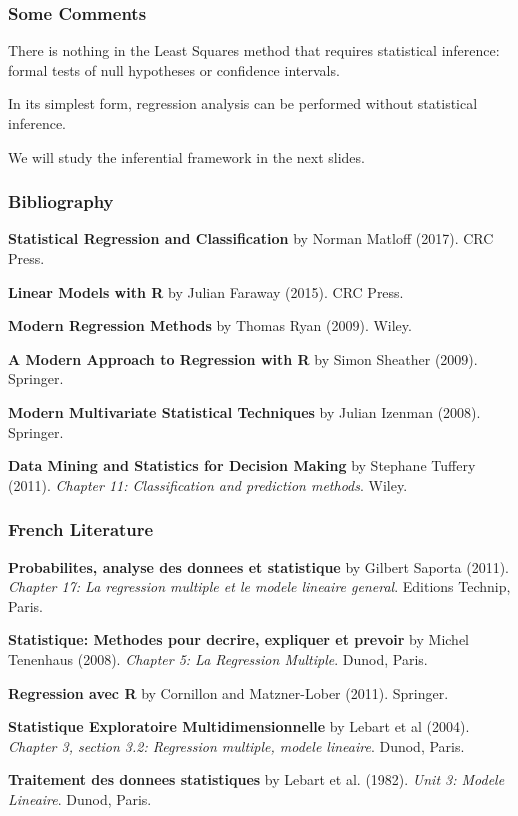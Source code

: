 \documentclass[12pt]{beamer}\usepackage[]{graphicx}\usepackage[]{color}
\begin{document}

\begin{frame}
\frametitle{Some Comments}

\bbi
  \item There is nothing in the Least Squares method that requires statistical inference:
formal tests of null hypotheses or confidence intervals.
  \item In its simplest form, regression analysis can be performed without statistical inference.
  \item We will study the inferential framework in the next slides.
\ei

\end{frame}


\begin{frame}
\frametitle{Bibliography}

{\footnotesize
\bi
  \item \textbf{Statistical Regression and Classification} by Norman Matloff (2017). CRC Press.
  \item \textbf{Linear Models with R} by Julian Faraway (2015). CRC Press.
  \item \textbf{Modern Regression Methods} by Thomas Ryan (2009). Wiley.
  \item \textbf{A Modern Approach to Regression with R} by Simon Sheather (2009). Springer.
  \item \textbf{Modern Multivariate Statistical Techniques} by Julian Izenman (2008). Springer.
  \item \textbf{Data Mining and Statistics for Decision Making} by Stephane Tuffery (2011).
  \textit{Chapter 11: Classification and prediction methods}. Wiley.
\ei
}

\end{frame}


\begin{frame}
\frametitle{French Literature}

{\footnotesize
\bi
  \item \textbf{Probabilites, analyse des donnees et statistique} by Gilbert Saporta (2011).
  \textit{Chapter 17: La regression multiple et le modele lineaire general}. 
  Editions Technip, Paris.
  \item \textbf{Statistique: Methodes pour decrire, expliquer et prevoir} 
  by Michel Tenenhaus (2008). \textit{Chapter 5: La Regression Multiple}. Dunod, Paris.
  \item \textbf{Regression avec R} by Cornillon and Matzner-Lober (2011). Springer.
  \item \textbf{Statistique Exploratoire Multidimensionnelle} by Lebart et al (2004).
  \textit{Chapter 3, section 3.2: Regression multiple, modele lineaire}. Dunod, Paris.
  \item \textbf{Traitement des donnees statistiques} by Lebart et al. (1982). 
  \textit{Unit 3: Modele Lineaire}. Dunod, Paris.
\ei
}

\end{frame}

\end{document}

